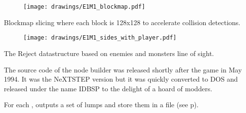 \begin{figure}[H]
\centering
\texttt{[image: drawings/E1M1\_blockmap.pdf]}
\end{figure}
\par
Blockmap slicing where each block is 128x128 to accelerate collision detections.\\
\par
\begin{figure}[H]
\centering
\texttt{[image: drawings/E1M1\_sides\_with\_player.pdf]}
\end{figure}
\par
The Reject datastructure based on enemies and monsters line of sight.
\pagebreak


The source code of the node builder was released shortly after the game in May 1994. It was the NeXTSTEP version but it was quickly converted to DOS and released under the name IDBSP to the delight of a hoard of modders.\\
\par
{}
\par
For each ,  outputs a set of lumps and store them in a  file (see p\pageref{wad_explained}).\\

